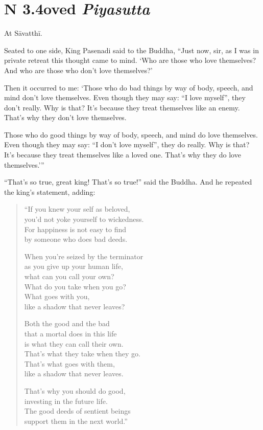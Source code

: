 \documentclass[12pt,openany]{book}%
\newcommand*{\suttatitleacronym}[1]{\smaller[2]{#1}\vspace*{.3em}}
\newcommand*{\suttatitletranslation}[1]{\linebreak{#1}}
\newcommand*{\suttatitleroot}[1]{\linebreak\smaller[2]\itshape{#1}}
\newcommand*{\tocacronym}[1]{\hspace*{-3.3em}{#1}\quad}
\newcommand*{\toctranslation}[1]{#1}
\newcommand*{\tocroot}[1]{(\textit{#1})}
\begin{document}
%
\section*{{\suttatitleacronym SN 3.4}{\suttatitletranslation Loved }{\suttatitleroot Piyasutta}}
\addcontentsline{toc}{section}{\tocacronym{SN 3.4} \toctranslation{Loved } \tocroot{Piyasutta}}

At \textsanskrit{Sāvatthī}. 

Seated to one side, King Pasenadi said to the Buddha, “Just now, sir, as I was in private retreat this thought came to mind. ‘Who are those who love themselves? And who are those who don’t love themselves?’ 

Then it occurred to me: ‘Those who do bad things by way of body, speech, and mind don’t love themselves. Even though they may say: “I love myself”, they don’t really. Why is that? It’s because they treat themselves like an enemy. That’s why they don’t love themselves. 

Those who do good things by way of body, speech, and mind do love themselves. Even though they may say: “I don’t love myself”, they do really. Why is that? It’s because they treat themselves like a loved one. That’s why they do love themselves.’” 

“That’s so true, great king! That’s so true!” said the Buddha. And he repeated the king’s statement, adding: 

\begin{verse}%
“If you knew your self as beloved, \\
you’d not yoke yourself to wickedness. \\
For happiness is not easy to find \\
by someone who does bad deeds. 

When you’re seized by the terminator \\
as you give up your human life, \\
what can you call your own? \\
What do you take when you go? \\
What goes with you, \\
like a shadow that never leaves? 

Both the good and the bad \\
that a mortal does in this life \\
is what they can call their own. \\
That’s what they take when they go. \\
That’s what goes with them, \\
like a shadow that never leaves. 

That’s why you should do good, \\
investing in the future life. \\
The good deeds of sentient beings \\
support them in the next world.” 

%
\end{verse}
\end{document}
